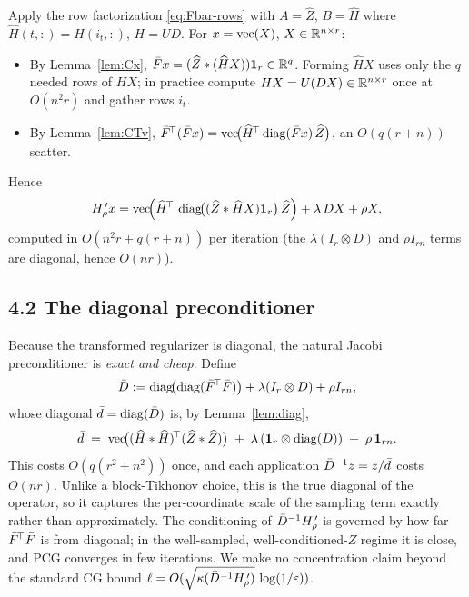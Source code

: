 \documentclass[11pt]{article}
\begin{document}
Apply the row factorization \eqref{eq:Fbar-rows} with $A=\widehat Z$,
$B=\widehat H$ where $\widehat H(t,:)=H(i_t,:)$, $H=UD$. For
$x=\operatorname{vec}(X)$, $X\in\mathbb{R}^{n\times r}$:
\begin{itemize}\setlength\itemsep{2pt}
\item By Lemma~\ref{lem:Cx}, $\bar F x=(\widehat Z\ast(\widehat H X))\mathbf 1_r\in\mathbb{R}^q$.
      Forming $\widehat H X$ uses only the $q$ needed rows of $HX$; in practice
      compute $HX=U(DX)\in\mathbb{R}^{n\times r}$ once at $O(n^2r)$ and gather rows
      $i_t$.
\item By Lemma~\ref{lem:CTv}, $\bar F^{\!\top}(\bar F x)
      =\operatorname{vec}\!\bigl(\widehat H^{\!\top}\operatorname{diag}(\bar F x)\,\widehat Z\bigr)$,
      an $O(q(r+n))$ scatter.
\end{itemize}
Hence
\begin{equation}\label{eq:matvec}
  H_\rho^{\,\prime}x
   = \operatorname{vec}\!\Bigl(\widehat H^{\!\top}\,\operatorname{diag}\!\bigl((\widehat Z\ast \widehat H X)\mathbf 1_r\bigr)\,\widehat Z\Bigr)
     + \lambda\,DX + \rho X,
\end{equation}
computed in $O(n^2r+q(r+n))$ per iteration (the $\lambda(I_r\otimes D)$ and
$\rho I_{rn}$ terms are diagonal, hence $O(nr)$).

\subsection*{4.2 The diagonal preconditioner}

Because the transformed regularizer is diagonal, the natural Jacobi
preconditioner is \emph{exact and cheap}. Define
\[
  \bar D := \operatorname{diag}\!\bigl(\operatorname{diag}(\bar F^{\!\top}\bar F)\bigr)+\lambda(I_r\otimes D)+\rho I_{rn},
\]
whose diagonal $\bar d=\operatorname{diag}(\bar D)$ is, by Lemma~\ref{lem:diag},
\begin{equation}\label{eq:precond}
  \bar d \;=\; \operatorname{vec}\!\bigl((\widehat H\ast \widehat H)^{\!\top}(\widehat Z\ast \widehat Z)\bigr)
        \;+\;\lambda\,(\mathbf 1_r\otimes\operatorname{diag}(D))\;+\;\rho\,\mathbf 1_{rn}.
\end{equation}
This costs $O(q(r^2+n^2))$ once, and each application
$\bar D^{-1}z=z/\bar d$ costs $O(nr)$. Unlike a block-Tikhonov choice, this is the
true diagonal of the operator, so it captures the per-coordinate scale of the
sampling term exactly rather than approximately. The conditioning of
$\bar D^{-1}H_\rho^{\,\prime}$ is governed by how far $\bar F^{\!\top}\bar F$ is from
diagonal; in the well-sampled, well-conditioned-$Z$ regime it is close, and
PCG converges in few iterations. We make no concentration claim beyond the
standard CG bound $\ell=O(\sqrt{\kappa(\bar D^{-1}H_\rho^{\,\prime})}\,\log(1/\varepsilon))$.
\end{document}
